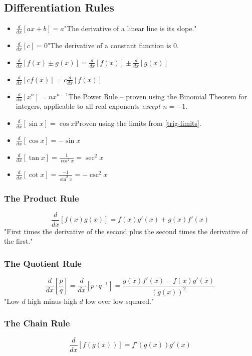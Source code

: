 \documentclass{article}
\begin{document}
\subsection{Differentiation Rules}
\begin{itemize}
    \item $\frac{d}{dx}\left[ax+b\right] = a$\quad"The derivative of a linear line is its slope."
    \item $\frac{d}{dx}\left[c\right] = 0$\quad"The derivative of a constant function is 0.
    \item $\frac{d}{dx}\left[f(x) \pm g(x)\right] = \frac{d}{dx}\left[f(x)\right] \pm \frac{d}{dx}\left[g(x)\right]$
    \item $\frac{d}{dx}\left[cf(x)\right] = c\frac{d}{dx}\left[f(x)\right]$
    \item $\frac{d}{dx}\left[x^n\right] = nx^{n-1}$\quad The Power Rule -- proven using the Binomial Theorem for integers, applicable to all real exponents \emph{except $n=-1$}.
    \item $\frac{d}{dx}\left[\sin{x}\right] = \cos{x}$\quad Proven using the limits from \ref{trig-limits}.
    \item $\frac{d}{dx}\left[\cos{x}\right] = -\sin{x}$
    \item $\frac{d}{dx}\left[\tan{x}\right] = \frac{1}{\cos^2{x}} = \sec^2{x}$
    \item $\frac{d}{dx}\left[\cot{x}\right] = \frac{-1}{\sin^2{x}} = -\csc^2{x}$
\end{itemize}

\subsubsection{The Product Rule}
$$\frac{d}{dx}\left[f(x)g(x)\right] = f(x)g'(x) + g(x)f'(x)$$
"First times the derivative of the second plus the second times the derivative of the first."

\subsubsection{The Quotient Rule}
$$\frac{d}{dx}\left[\frac{p}{q}\right] = \frac{d}{dx}\left[p\cdot q^{-1}\right] = \frac{g(x)f'(x) - f(x)g'(x)}{\left(g(x)\right)^2}$$
"Low $d$ high minus high $d$ low over low squared."

\subsubsection{The Chain Rule}\label{chain}
$$\frac{d}{dx}\left[f(g(x))\right] = f'(g(x))g'(x)$$
\end{document}
